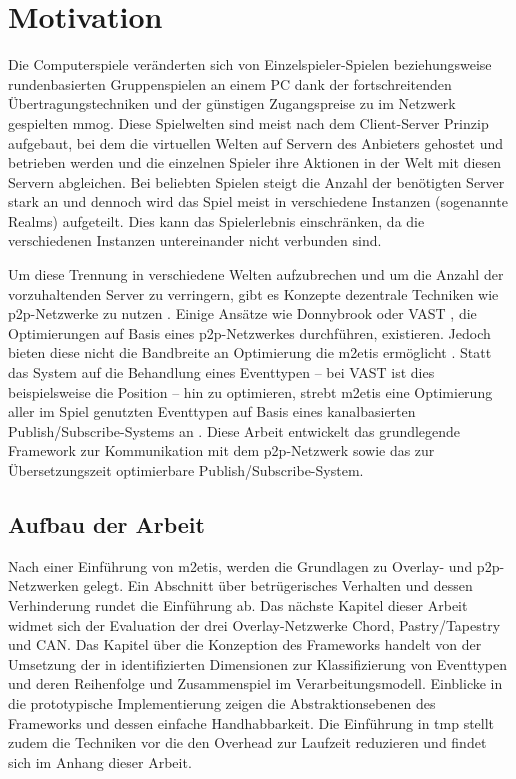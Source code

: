 \chapter{Motivation}
\label{chap:einleitung}
Die Computerspiele veränderten sich von Einzelspieler-Spielen beziehungsweise rundenbasierten Gruppenspielen an einem PC dank der fortschreitenden Übertragungs\-techniken und der günstigen Zugangspreise zu im Netzwerk gespielten \ac{mmog}. Diese Spielwelten sind meist nach dem Client-Server Prinzip aufgebaut, bei dem die virtuellen Welten auf Servern des Anbieters gehostet und betrieben werden und die einzelnen Spieler ihre Aktionen in der Welt mit diesen Servern abgleichen. Bei beliebten Spielen steigt die Anzahl der benötigten Server stark an und dennoch wird das Spiel meist in verschiedene Instanzen (sogenannte Realms) aufgeteilt. Dies kann das Spielerlebnis einschränken, da die verschiedenen Instanzen untereinander nicht verbunden sind.

Um diese Trennung in verschiedene Welten aufzubrechen und um die Anzahl der vorzuhaltenden Server zu verringern, gibt es Konzepte dezentrale Techniken wie \ac{p2p}-Netzwerke zu nutzen \cite{Knutsson2004Peertopeer, Triebel2008Peertopeer}. Einige Ansätze wie Donnybrook \cite{Bharambe2008Donnybrook} oder VAST \cite{Backhaus2007Voronoibased}, die Optimierungen auf Basis eines \ac{p2p}-Netzwerkes durchführen, existieren. Jedoch bieten diese nicht die Bandbreite an Optimierung die \ac{m2etis} ermöglicht \cite{Fischer2010Event}. Statt das System auf die Behandlung eines Eventtypen -- bei VAST ist dies beispielsweise die Position -- hin zu optimieren, strebt \ac{m2etis} eine Optimierung aller im Spiel genutzten Eventtypen auf Basis eines kanalbasierten Publish/Subscribe-Systems an \cite{Fischer2010a}. Diese Arbeit entwickelt das grundlegende Framework zur Kommunikation mit dem \ac{p2p}-Netzwerk sowie das zur Übersetzungszeit optimierbare Publish/Subscribe-System.

\section*{Aufbau der Arbeit}
Nach einer Einführung von \ac{m2etis}, werden die Grundlagen zu Overlay- und p2p-Netzwerken gelegt. Ein Abschnitt über betrügerisches Verhalten und dessen Verhinderung rundet die Einführung ab. Das nächste Kapitel dieser Arbeit widmet sich der Evaluation der drei Overlay-Netzwerke Chord, Pastry/Tapestry und CAN. Das Kapitel über die Konzeption des Frameworks handelt von der Umsetzung der in \cite{Fischer2010Event} identifizierten Dimensionen zur Klassifizierung von Eventtypen und deren Reihenfolge und Zusammenspiel im Verarbeitungsmodell. Einblicke in die prototypische Implementierung zeigen die Abstraktionsebenen des Frameworks und dessen einfache Handhabbarkeit. Die Einführung in \ac{tmp} stellt zudem die Techniken vor die den Overhead zur Laufzeit reduzieren und findet sich im Anhang dieser Arbeit.
